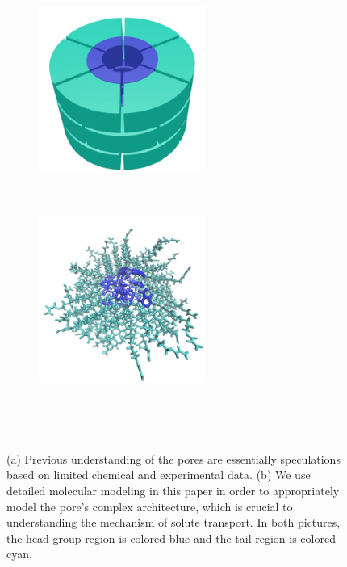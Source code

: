 \documentclass[journal=jpcbfk,manuscript=article]{achemso}
\begin{document}
  \begin{figure}[!htb]
  \centering
	\begin{subfigure}{0.45\linewidth}
		\centering
		\includegraphics[width=0.6\textwidth]{cartoon_pore.pdf}
		\caption{}~\label{fig:undetailed_pore}
	\end{subfigure}
	\begin{subfigure}{0.45\linewidth}
		\centering
		\includegraphics[width=0.6\textwidth]{detailed_pore.pdf}
		\caption{}~\label{fig:detailed_pore}
	\end{subfigure} 
    \caption{(a) Previous understanding of the pores are essentially speculations 
    based on limited chemical and experimental data. (b) We use detailed molecular 
    modeling in this paper in order to appropriately model the pore's complex architecture,
    which is crucial to understanding the mechanism of solute transport. In both 
    pictures, the head group region is colored blue and the tail region is colored cyan.}~\label{fig:detail}
  \end{figure}
 
\end{document}
